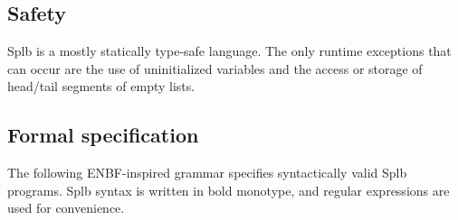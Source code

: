 \documentclass[english,10pt]{article} %
\theoremstyle{definitionstyle}
\theoremstyle{lemmastyle}
\begin{document}
\subsection{Safety}

Splb is a mostly statically type-safe language. The only runtime exceptions that can occur are the use of uninitialized variables and the access or storage of head/tail segments of empty lists.


\subsection{Formal specification}

The following ENBF-inspired grammar specifies syntactically valid Splb programs. Splb syntax is written in bold monotype, and regular expressions are used for convenience.

\end{document}
